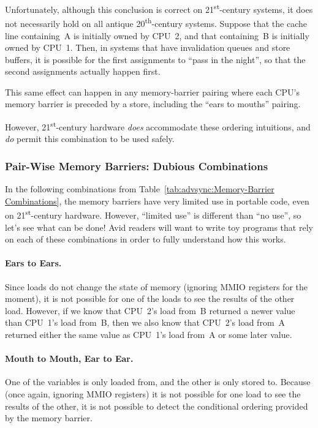 	Unfortunately, although this conclusion is correct on
	21\textsuperscript{st}-century systems, it does not necessarily hold
	on all antique 20\textsuperscript{th}-century systems.
	Suppose that the cache line containing~A is initially owned
	by CPU~2, and that containing~B is initially owned by CPU~1.
	Then, in systems that have invalidation queues and store
	buffers, it is possible for the first assignments to ``pass
	in the night'', so that the second assignments actually
	happen first.
		 {}

	This same effect can happen in any memory-barrier pairing
	where each CPU's memory barrier is preceded by a store,
	including the ``ears to mouths'' pairing.

	However, 21\textsuperscript{st}-century hardware \emph{does}
	accommodate these ordering intuitions, and \emph{do} permit
	this combination to be used safely.

\subsubsection{Pair-Wise Memory Barriers: Dubious Combinations}

In the following combinations from
Table~\ref{tab:advsync:Memory-Barrier Combinations},
the memory barriers have very limited use in portable code, even
on 21\textsuperscript{st}-century hardware.
However, ``limited use'' is different than ``no use'', so let's see
what can be done!
Avid readers will want to write toy programs that rely on each of
these combinations in order to fully understand how this works.

\paragraph{Ears to Ears.}
	Since loads do not change the state of memory
	(ignoring MMIO registers for the moment),
	it is not possible for one of the loads to see the
	results of the other load.
	However, if we know that CPU~2's load from~B returned a
	newer value than CPU~1's load from~B, then we also know
	that CPU~2's load from~A returned either the same value
	as CPU~1's load from~A or some later value.

\paragraph{Mouth to Mouth, Ear to Ear.}
	One of the variables is only loaded from, and the other
	is only stored to.
	Because (once again, ignoring MMIO registers) it is not
	possible for one load to see the results of the other,
	it is not possible to detect the conditional ordering
	provided by the memory barrier.

